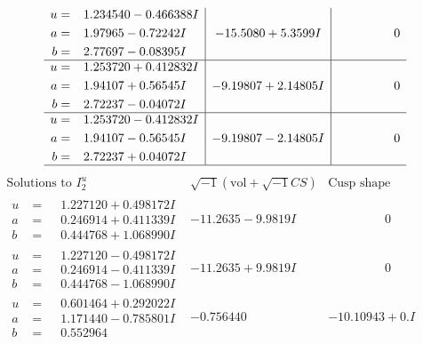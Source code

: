 \documentclass[1p]{elsarticle_modified}
\theoremstyle{definition}
\newcommand{\I}{\sqrt{-1}}
\begin{document}
$$\begin{array}{c|c|c}
\begin{aligned}
u &= \phantom{-}1.234540 - 0.466388 I \\
a &= \phantom{-}1.97965 - 0.72242 I \\
b &= \phantom{-}2.77697 - 0.08395 I\end{aligned}
 & -15.5080 + 5.3599 I & \phantom{-0.000000 } 0 \\ \hline\begin{aligned}
u &= \phantom{-}1.253720 + 0.412832 I \\
a &= \phantom{-}1.94107 + 0.56545 I \\
b &= \phantom{-}2.72237 - 0.04072 I\end{aligned}
 & -9.19807 + 2.14805 I & \phantom{-0.000000 } 0 \\ \hline\begin{aligned}
u &= \phantom{-}1.253720 - 0.412832 I \\
a &= \phantom{-}1.94107 - 0.56545 I \\
b &= \phantom{-}2.72237 + 0.04072 I\end{aligned}
 & -9.19807 - 2.14805 I & \phantom{-0.000000 } 0\\
 \hline 
 \end{array}$$\newpage$$\begin{array}{c|c|c}  
\text{Solutions to }I^u_{2}& \I (\text{vol} + \sqrt{-1}CS) & \text{Cusp shape}\\
 \hline 
\begin{aligned}
u &= \phantom{-}1.227120 + 0.498172 I \\
a &= \phantom{-}0.246914 + 0.411339 I \\
b &= \phantom{-}0.444768 + 1.068990 I\end{aligned}
 & -11.2635 - 9.9819 I & \phantom{-0.000000 } 0 \\ \hline\begin{aligned}
u &= \phantom{-}1.227120 - 0.498172 I \\
a &= \phantom{-}0.246914 - 0.411339 I \\
b &= \phantom{-}0.444768 - 1.068990 I\end{aligned}
 & -11.2635 + 9.9819 I & \phantom{-0.000000 } 0 \\ \hline\begin{aligned}
u &= \phantom{-}0.601464 + 0.292022 I \\
a &= \phantom{-}1.171440 - 0.785801 I \\
b &= \phantom{-}0.552964\phantom{ +0.000000I}\end{aligned}
 & -0.756440\phantom{ +0.000000I} & -10.10943 + 0. I\phantom{ +0.000000I} \\ \hline\begin{aligned}

\end{aligned}
\end{array}$$
\end{document}
